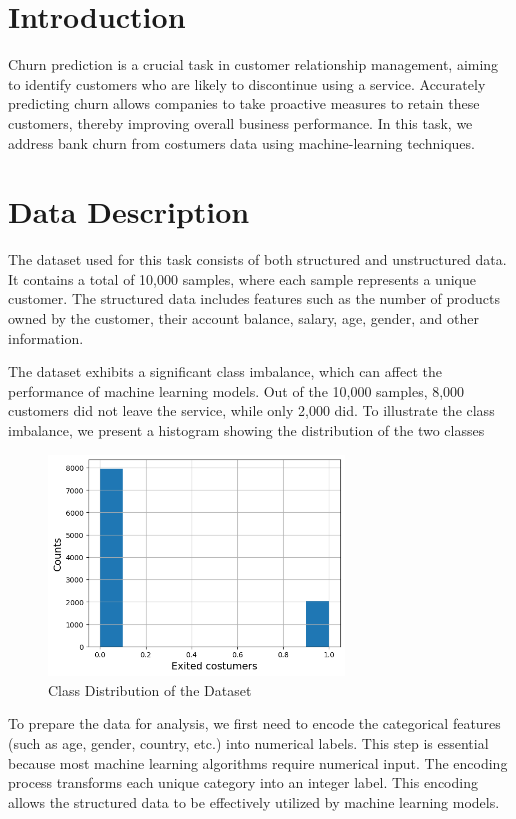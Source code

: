 \documentclass[12pt]{article}
\begin{document}
\section{Introduction}
Churn prediction is a crucial task in customer relationship management, aiming to identify customers who are likely to discontinue using a service. Accurately predicting churn allows companies to take proactive measures to retain these customers, thereby improving overall business performance. In this task, we address bank churn from costumers data using machine-learning techniques. 

\section{Data Description}
The dataset used for this task consists of both structured and unstructured data. It contains a total of 10,000 samples, where each sample represents a unique customer. The structured data includes features such as the number of products owned by the customer, their account balance, salary, age, gender, and other information. 

The dataset exhibits a significant class imbalance, which can affect the performance of machine learning models. Out of the 10,000 samples, 8,000 customers did not leave the service, while only 2,000 did. To illustrate the class imbalance, we present a histogram showing the distribution of the two classes

\begin{figure}[h!]
    \centering
    \includegraphics[width=0.7\textwidth]{figures/class_distribution.png}
    \caption{Class Distribution of the Dataset}
    \label{fig:class_distribution}
\end{figure}

To prepare the data for analysis, we first need to encode the categorical features (such as age, gender, country, etc.) into numerical labels. This step is essential because most machine learning algorithms require numerical input. The encoding process transforms each unique category into an integer label. This encoding allows the structured data to be effectively utilized by machine learning models.
\end{document}
